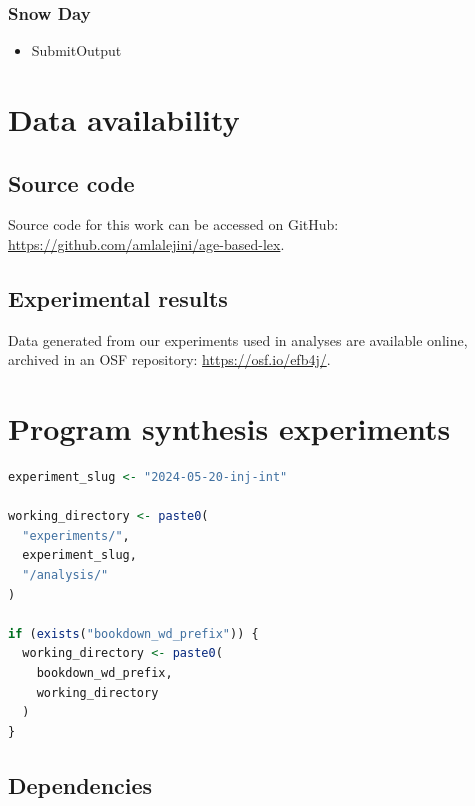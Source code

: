\documentclass[
]{book}
\providecommand{\tightlist}{%
  \setlength{\itemsep}{0pt}\setlength{\parskip}{0pt}}
\begin{document}
\hypertarget{snow-day}{%
\subsection{Snow Day}\label{snow-day}}

\begin{itemize}
\tightlist
\item
  SubmitOutput
\end{itemize}

\hypertarget{data-availability}{%
\chapter{Data availability}\label{data-availability}}

\hypertarget{source-code}{%
\section{Source code}\label{source-code}}

Source code for this work can be accessed on GitHub: \url{https://github.com/amlalejini/age-based-lex}.

\hypertarget{experimental-results}{%
\section{Experimental results}\label{experimental-results}}

Data generated from our experiments used in analyses are available online, archived in an OSF repository: \url{https://osf.io/efb4j/}.

\hypertarget{program-synthesis-experiments}{%
\chapter{Program synthesis experiments}\label{program-synthesis-experiments}}

\begin{lstlisting}[language=R]
experiment_slug <- "2024-05-20-inj-int"

working_directory <- paste0(
  "experiments/",
  experiment_slug,
  "/analysis/"
)

if (exists("bookdown_wd_prefix")) {
  working_directory <- paste0(
    bookdown_wd_prefix,
    working_directory
  )
}
\end{lstlisting}

\hypertarget{dependencies}{%
\section{Dependencies}\label{dependencies}}
\end{document}
